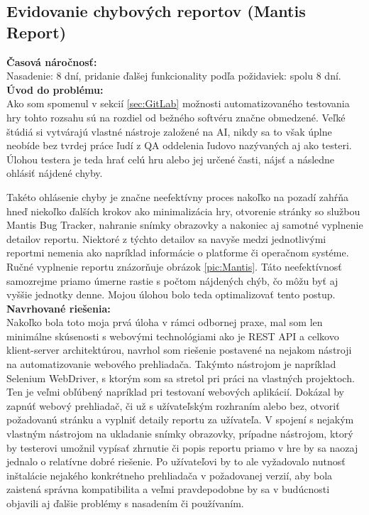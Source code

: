 \documentclass[slovak, bachelorpractice]{diploma}
\begin{document}
\subsection{Evidovanie chybových reportov (Mantis Report)}
\label{sec:Report}
\textbf{Časová náročnosť:} \\ Nasadenie: 8 dní, pridanie ďalšej funkcionality podľa požidaviek: spolu 8 dní.\\
\textbf{Úvod do problému:} \\ Ako som spomenul v sekcií \ref{sec:GitLab} možnosti automatizovaného testovania hry tohto rozsahu sú na rozdiel od bežného softvéru značne obmedzené. Veľké štúdiá si vytvárajú vlastné nástroje založené na AI, nikdy sa to však úplne neobíde bez tvrdej práce ľudí z QA oddelenia ľudovo nazývaných aj ako testeri. Úlohou testera je teda hrať celú hru alebo jej určené časti, nájsť a následne ohlásiť nájdené chyby. 

Takéto ohlásenie chyby je značne neefektívny proces nakoľko na pozadí zahŕňa hneď niekoľko ďalších krokov ako minimalizácia hry, otvorenie stránky so službou Mantis Bug Tracker, nahranie snímky obrazovky a nakoniec aj samotné vyplnenie detailov reportu. Niektoré z týchto detailov sa navyše medzi jednotlivými reportmi nemenia ako napríklad informácie o platforme či operačnom systéme. Ručné vyplnenie reportu znázorňuje obrázok \ref{pic:Mantis}.
Táto neefektívnosť samozrejme priamo úmerne rastie s počtom nájdených chýb, čo môžu byť aj vyššie jednotky denne. Mojou úlohou bolo teda optimalizovať tento postup. \\
\textbf{Navrhované riešenia:} \\ Nakoľko bola toto moja prvá úloha v rámci odbornej praxe, mal som len minimálne skúsenosti s webovými technológiami ako je REST API a celkovo klient-server architektúrou, navrhol som riešenie postavené na nejakom nástroji na automatizovanie webového prehliadača. Takýmto nástrojom je napríklad Selenium WebDriver, s ktorým som sa stretol pri práci na vlastných projektoch. Ten je veľmi obľúbený napríklad pri testovaní webových aplikácií. Dokázal by zapnúť webový prehliadač, či už s užívateľským rozhraním alebo bez, otvoriť požadovanú stránku a vyplniť detaily reportu za užívateľa. V spojení s nejakým vlastným nástrojom na ukladanie snímky obrazovky, prípadne nástrojom, ktorý by testerovi umožnil vypísať zhrnutie či popis reportu priamo v hre by sa naozaj jednalo o relatívne dobré riešenie. Po užívateľovi by to ale vyžadovalo nutnosť inštalácie nejakého konkrétneho prehliadača v požadovanej verzií, aby bola zaistená správna kompatibilita a veľmi pravdepodobne by sa v budúcnosti objavili aj ďalšie problémy s nasadením či používaním. 
\end{document}
